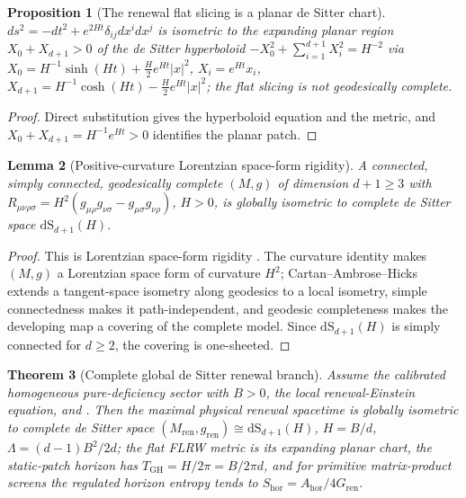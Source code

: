 \documentclass[11pt]{article}
\newtheorem{theorem}{Theorem}[section]
\newtheorem{proposition}[theorem]{Proposition}
\newtheorem{lemma}[theorem]{Lemma}
\theoremstyle{definition}
\theoremstyle{remark}
\newcommand{\dS}{\mathrm{dS}}
\newcommand{\hor}{\mathrm{hor}}
\newcommand{\ren}{\mathrm{ren}}
\newcommand{\GH}{\mathrm{GH}}
\newcommand{\Gren}{G_{\mathrm{ren}}}
\begin{document}
\begin{proposition}[The renewal flat slicing is a planar de Sitter chart]
\label{prop:planar-desitter-chart}
$ds^2=-dt^2+e^{2Ht}\delta_{ij}dx^idx^j$ is isometric to the expanding planar region
$X_0+X_{d+1}>0$ of the de Sitter hyperboloid
$-X_0^2+\sum_{i=1}^{d+1}X_i^2=H^{-2}$ via
$X_0=H^{-1}\sinh(Ht)+\tfrac H2e^{Ht}|x|^2$, $X_i=e^{Ht}x_i$,
$X_{d+1}=H^{-1}\cosh(Ht)-\tfrac H2e^{Ht}|x|^2$; the flat slicing is not
geodesically complete.
\end{proposition}

\begin{proof}
Direct substitution gives the hyperboloid equation and the metric, and
$X_0+X_{d+1}=H^{-1}e^{Ht}>0$ identifies the planar patch.
\end{proof}

\begin{lemma}[Positive-curvature Lorentzian space-form rigidity]
\label{lem:desitter-spaceform-rigidity}
A connected, simply connected, geodesically complete $(M,g)$ of dimension
$d+1\ge3$ with
$R_{\mu\nu\rho\sigma}=H^2(g_{\mu\rho}g_{\nu\sigma}-g_{\mu\sigma}g_{\nu\rho})$,
$H>0$, is globally isometric to complete de Sitter space $\dS_{d+1}(H)$.
\end{lemma}

\begin{proof}
This is Lorentzian space-form rigidity \cite{ONeill,Wolf}.  The curvature identity
makes $(M,g)$ a Lorentzian space form of curvature $H^2$; Cartan--Ambrose--Hicks
extends a tangent-space isometry along geodesics to a local isometry, simple
connectedness makes it path-independent, and geodesic completeness makes the
developing map a covering of the complete model.  Since $\dS_{d+1}(H)$ is simply
connected for $d\ge2$, the covering is one-sheeted.
\end{proof}

\begin{theorem}[Complete global de Sitter renewal branch]
\label{thm:complete-global-desitter}
Assume the calibrated homogeneous pure-deficiency sector with $B>0$, the local
renewal-Einstein equation, and .  Then
the maximal physical renewal spacetime is globally isometric to complete de Sitter
space $(M_{\ren},g_{\ren})\cong\dS_{d+1}(H)$, $H=B/d$,
$\Lambda=(d-1)B^2/2d$; the flat FLRW metric is its expanding planar chart, the
static-patch horizon has $T_{\GH}=H/2\pi=B/2\pi d$, and for primitive
matrix-product screens the regulated horizon entropy tends to
$S_{\hor}=A_{\hor}/4\Gren$.
\end{theorem}
\end{document}
